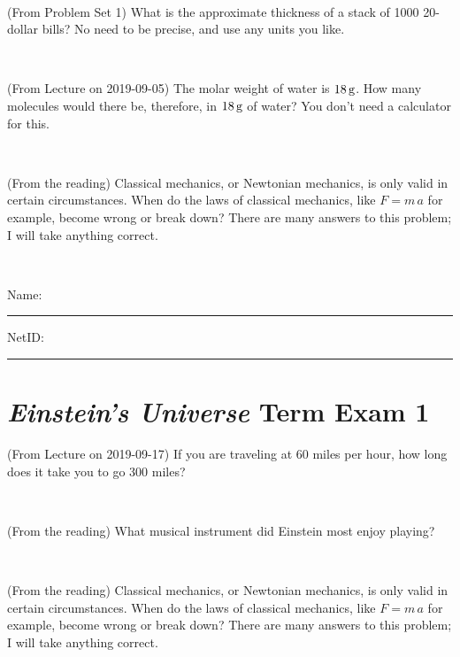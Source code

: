 \documentclass[12pt, letterpaper]{article}
\begin{document}
\vfill ~

\begin{problem} (From Problem Set 1)
What is the approximate thickness of a stack of 1000 20-dollar bills?
No need to be precise, and use any units you like.
\end{problem}


\vfill ~

\begin{problem} (From Lecture on 2019-09-05)
The molar weight of water is $18\,\mathrm{g}$. How many molecules would there
be, therefore, in $18\,\mathrm{g}$ of water? You don't need a calculator for
this.
\end{problem}


\vfill ~

\begin{problem} (From the reading)
Classical mechanics, or Newtonian mechanics, is only valid in certain
circumstances. When do the laws of classical mechanics, like $F =
m\,a$ for example, become wrong or break down? There are many answers
to this problem; I will take anything correct.
\end{problem}


\vfill ~


\cleardoublepage



\noindent
Name: \rule[-1ex]{0.60\textwidth}{0.1pt}
NetID: \rule[-1ex]{0.20\textwidth}{0.1pt}

\section*{\textsl{Einstein's Universe} Term Exam 1}
\setcounter{problem}{1}


\begin{problem} (From Lecture on 2019-09-17)
If you are traveling at 60 miles per hour, how long does
it take you to go 300 miles?
\end{problem}


\vfill ~

\begin{problem} (From the reading)
What musical instrument did Einstein most enjoy playing?
\end{problem}


\vfill ~

\begin{problem} (From the reading)
Classical mechanics, or Newtonian mechanics, is only valid in certain
circumstances. When do the laws of classical mechanics, like $F =
m\,a$ for example, become wrong or break down? There are many answers
to this problem; I will take anything correct.
\end{problem}
\end{document}

